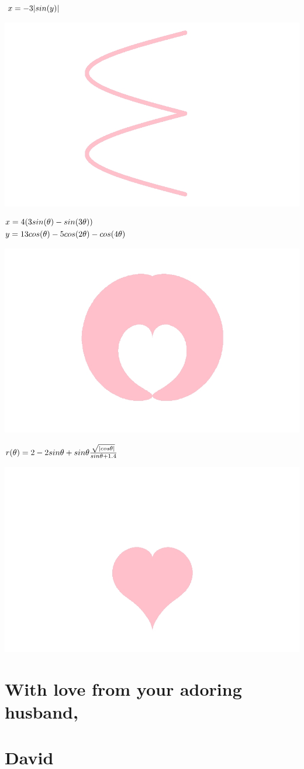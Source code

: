\documentclass[
]{article}
\begin{document}
\(\LARGE x=-3\lvert sin(y)\rvert \hspace{6cm}\)

\includegraphics[width=0.5\linewidth]{E}

\(\begin{align} & \LARGE x=4(3sin(\theta) - sin(3\theta))\\ &\LARGE y=13cos(\theta) - 5cos(2\theta) - cos(4\theta) \end{align}\)

\includegraphics[width=0.5\linewidth]{Heart1}

\(\LARGE r(\theta) = 2-2sin\theta+sin\theta \frac{\sqrt{\lvert cos\theta \rvert}}{sin\theta + 1.4} \hspace{1.2cm}\)

\includegraphics[width=0.5\linewidth]{Heart2}

\hypertarget{with-love-from-your-adoring-husband}{%
\section{With love from your adoring
husband,}\label{with-love-from-your-adoring-husband}}

\hypertarget{david}{%
\section{David}\label{david}}
\end{document}
